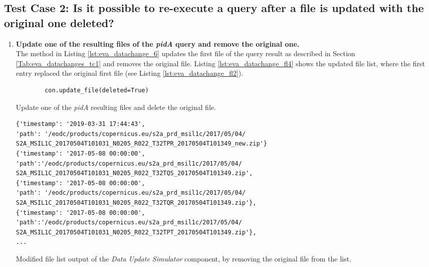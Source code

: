 \documentclass[draft,final]{vutinfth} %
\newenvironment{code}{\captionsetup{type=listing}}{}
\begin{document}
\subsection{Test Case 2: Is it possible to re-execute a query after a file is updated with the original one deleted?}

\begin{enumerate}
	\setcounter{enumi}{+1}
	\item \textbf{Update one of the resulting files of the \textit{pidA} query and remove the original one.}\\ 
	The method in Listing \ref{lst:eva_datachange_6} updates the first file of the query result as described in Section \ref{Tab:eva_datachanges_tc1} and removes the original file. Listing \ref{lst:eva_datachange_fl4} shows the updated file list, where the first entry replaced the original first file (see Listing \ref{lst:eva_datachange_fl2}).
	\begin{code}
		\begin{verbatim}
		con.update_file(deleted=True)
		\end{verbatim}
		\caption{Update one of the \textit{pidA} resulting files and delete the original file.}
		\label{lst:eva_datachange_6}
	\end{code}
	
	\begin{code}
		\begin{verbatim} 
{'timestamp': '2019-03-31 17:44:43', 
'path': '/eodc/products/copernicus.eu/s2a_prd_msil1c/2017/05/04/
S2A_MSIL1C_20170504T101031_N0205_R022_T32TPR_20170504T101349_new.zip'}
{'timestamp': '2017-05-08 00:00:00',
'path':'/eodc/products/copernicus.eu/s2a_prd_msil1c/2017/05/04/
S2A_MSIL1C_20170504T101031_N0205_R022_T32TQS_20170504T101349.zip', 
{'timestamp': '2017-05-08 00:00:00', 
'path': '/eodc/products/copernicus.eu/s2a_prd_msil1c/2017/05/04/
S2A_MSIL1C_20170504T101031_N0205_R022_T32TQR_20170504T101349.zip'}, 
{'timestamp': '2017-05-08 00:00:00',
'path':'/eodc/products/copernicus.eu/s2a_prd_msil1c/2017/05/04/
S2A_MSIL1C_20170504T101031_N0205_R022_T32TPT_20170504T101349.zip'},
...
		\end{verbatim}
		\caption{Modified file list output of the \textit{Data Update Simulator} component, by removing the original file from the list.}
		\label{lst:eva_datachange_fl4}
	\end{code}	


\end{enumerate}
\end{document}
